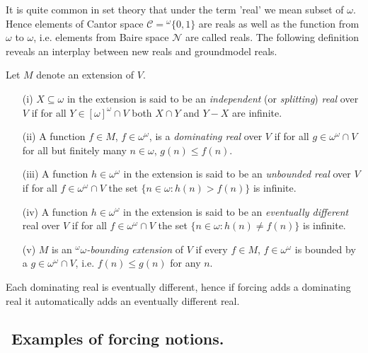 It is quite common in set theory that under the term 'real'
we mean subset of $\omega$. Hence elements of Cantor space
$\mathcal C = {}^\omega \{0,1\}$ are reals as well as the
function from $\omega$ to $\omega$, i.e. elements from
Baire space $\mathcal N$ are called reals.
The following definition reveals an interplay between
new reals and groundmodel reals.

\begin{definition}
Let $M$ denote an extension of $V$.
\begin{itemize}
\item[(i)] $X\subseteq \omega$ in
	the extension is said to be an \emph{independent}
	 (or \emph{splitting}) \emph{real}
	over $V$ if for all $Y\in[\omega]^\omega\cap V$ both $X\cap Y$ and
	$Y-X$ are infinite.
\item[(ii)] A function $f\in M$, $f\in \omega^\omega$,
	is a \emph{dominating real} over $V$ if for all
	$g\in \omega^\omega \cap V$ for all but finitely many
	$n\in \omega$, $g(n) \leq f(n)$.
\item[(iii)] A function $h \in \omega^\omega$ in the extension is said to be an
	\emph{unbounded real} over $V$ if for all $f \in \omega^\omega \cap
	V$   the set $\{n \in \omega : h(n) > f(n) \}$ is infinite.
\item[(iv)] A function $h \in \omega^\omega$ in the extension is said to be an
	\emph{eventually different} real over $V$ if for all $f \in \omega^\omega \cap
	V$   the set $\{n \in \omega : h(n) \not = f(n) \}$ is infinite.
\item[(v)] $M$ is an \emph{${}^\omega \omega$-bounding extension} of
	$V$ if every $f\in M$, $f\in \omega^\omega$ is bounded by a
	$g\in \omega^\omega\cap V$, i.e. $f(n)\leq g(n)$ for any $n$.
\end{itemize}
\end{definition}

\begin{remark}
 Each dominating real is eventually different, hence if forcing adds a dominating
 real it automatically adds an eventually different real.
\end{remark}


\subsection{${}$ \hspace{-1em}Examples of forcing notions.}

